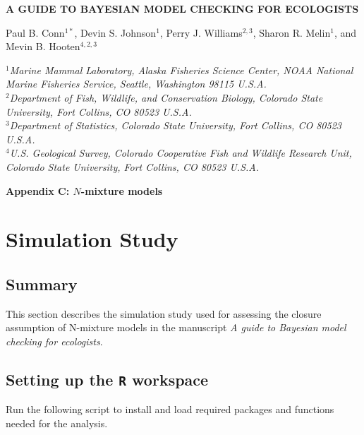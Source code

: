 \documentclass[12pt,letterpaper,final]{article}\usepackage[]{graphicx}\usepackage[]{color}
\begin{document}
\begin{center}
  \bf {\large A GUIDE TO BAYESIAN MODEL CHECKING FOR ECOLOGISTS}

  \vspace{0.7cm} Paul B. Conn$^{1*}$, Devin S. Johnson$^1$, Perry
  J. Williams$^{2,3}$, Sharon R. Melin$^1$, and Mevin
  B. Hooten$^{4,2,3}$
\end{center}
\vspace{0.5cm}


\rm \small

\it $^1$Marine Mammal Laboratory, Alaska Fisheries Science Center,
NOAA National Marine Fisheries Service,
Seattle, Washington 98115 U.S.A.\\

\it $^2$Department of Fish, Wildlife, and Conservation Biology, Colorado State University, Fort Collins, CO 80523 U.S.A.\\

\it $^3$Department of Statistics, Colorado State University, Fort Collins, CO 80523 U.S.A.\\

\it $^4$U.S. Geological Survey, Colorado Cooperative Fish and Wildlife
Research Unit, Colorado State University, Fort Collins, CO 80523
U.S.A.

\vspace{0.7cm}

\textbf{\Large Appendix C: $N$-mixture models} \\


\tableofcontents

\listoftables

\listoffigures


\pagebreak

\section{Simulation Study}

\subsection{Summary}
This section describes the simulation study used for assessing the
closure assumption of N-mixture models in the manuscript \emph{A guide
  to Bayesian model checking for ecologists}.



\subsection{Setting up the \texttt{R} workspace}
Run the following script to install and load required packages and
functions needed for the analysis.
\end{document}
